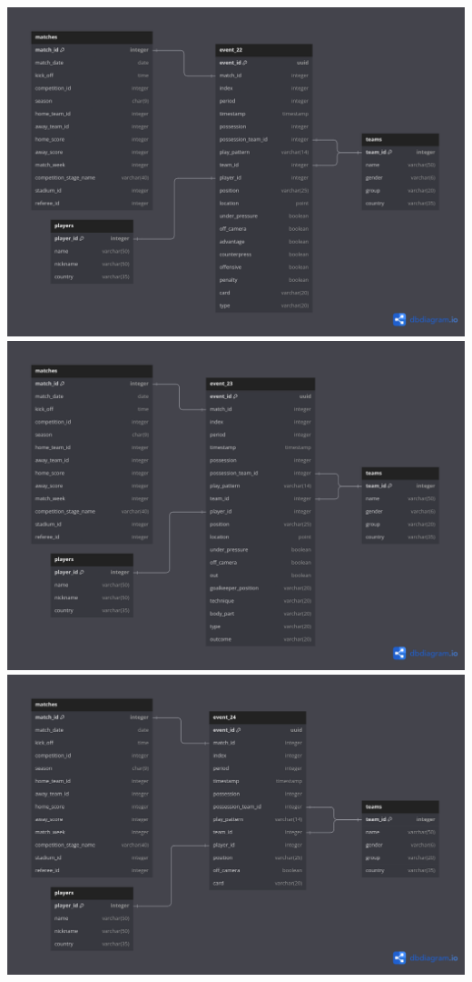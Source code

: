 \documentclass[12pt]{article}
\begin{document}
\includegraphics[width=\textwidth]{schema-diagram/event_22.png}
\includegraphics[width=\textwidth]{schema-diagram/event_23.png}
\includegraphics[width=\textwidth]{schema-diagram/event_24.png}
\end{document}
